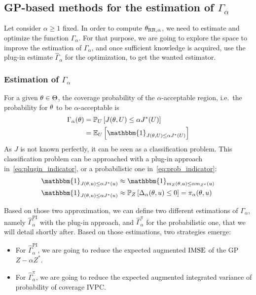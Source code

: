 \documentclass[../../Main_ManuscritThese.tex]{subfiles}
\begin{document}
\subsection{GP-based methods for the estimation of $\Gamma_{\alpha}$}
\label{sec:evaluation_gamma}
Let consider $\alpha\geq 1$ fixed. In order to compute
${\theta}_{\mathrm{RR, \alpha}}$, we need to estimate and optimize the
function $\Gamma_{\alpha}$. For that purpose, we are going to explore
the space to improve the estimation of $\Gamma_{\alpha}$, and once
sufficient knowledge is acquired, use the plug-in %
estimate $\hat{\Gamma}_{\alpha}$ for the optimization, to get the
wanted estimator.

\subsubsection{Estimation of $\Gamma_{\alpha}$}

For a given $\theta\in\Theta$, the coverage probability of the
$\alpha$-acceptable region, i.e.\ the probability for $\theta$ to be
$\alpha$-acceptable is
\begin{align}
  \Gamma_{\alpha}(\kk)  & = \Prob_{U}\left[J(\kk,\UU) \leq \alpha J^*(\UU)\right] \\
                      & =\Ex_{U}\left[\mathbbm{1}_{J(\kk,\UU) \leq \alpha J^*(\UU)}\right]
\end{align}
As $J$ is not known perfectly, it can be seen as a classification
problem.  This classification problem can be approached with a plug-in
approach in~\cref{eq:plugin_indicator}, or a probabilistic one
in~\cref{eq:prob_indicator}:
\begin{align}
  \mathbbm{1}_{J(\kk,\uu) \leq \alpha J^*(\uu)} & \approx   \mathbbm{1}_{m_Z(\kk,\uu) \leq \alpha m_{{Z^*}}(\uu)} \label{eq:plugin_indicator} \\
  \mathbbm{1}_{J(\kk,\uu) \leq \alpha J^*(\uu)} & \approx   \Prob_{Z}\left[ \Delta_{\alpha}(\kk,\uu) \leq 0 \right] = \pi_{\alpha}(\kk,\uu) \label{eq:prob_indicator}
\end{align}

Based on those two approximation, we can define two different
estimations of $\Gamma_\alpha$, namely
$\hat{\Gamma}_\alpha^{\mathrm{PI}}$ with the plug-in approach, and
$\hat{\Gamma}_{\alpha}^{\pi}$ for the probabilistic one, that we will
detail shortly after. Based on those estimations, two strategies
emerge:
\begin{itemize}
\item For $\hat{\Gamma}_{\alpha}^{\mathrm{PI}}$, we are going to
  reduce the expected augmented $\operatorname{\mathrm{IMSE}}$ of the GP $Z - \alpha Z^*$.
\item For $\hat{\Gamma}_{\alpha}^{\pi}$, we are going to reduce the
  expected augmented integrated variance of probability of coverage
  $\mathrm{IVPC}$.
\end{itemize}
\end{document}
